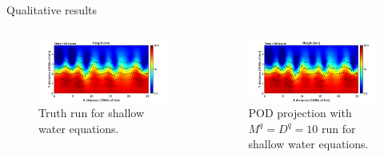 \documentclass[aspectratio=169]{beamer}
\begin{document}

\begin{frame}{Qualitative results}
\vfill
    \begin{columns}
    \begin{column}{.49\textwidth}
\begin{figure}[H]
\centering
\includegraphics[width=\textwidth]{figures/swe_truth.png}
\caption{Truth run for shallow water equations.}
\end{figure}
    \end{column}

 \begin{column}{.49\textwidth}
\begin{figure}[H]
\centering
\includegraphics[width=\textwidth]{figures/swe_pod10.png}
\caption{POD projection with $M^q=D^q=10$ run for shallow water equations.}
\end{figure}
 \end{column}
\end{columns}
\vfill
\end{frame}

\end{document}
